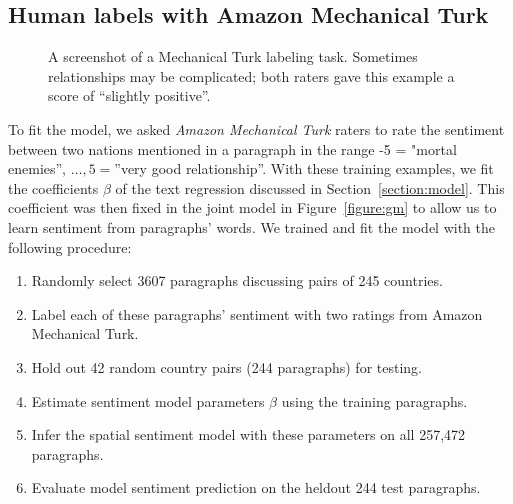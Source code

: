 \subsection{Human labels with Amazon Mechanical Turk}
\label{section:mturk}
\begin{figure}
  \setlength\fboxsep{0pt}
  \setlength\fboxrule{0.5pt}
  \center {}
  \label{figure:mechanical_turk_sample}
  \small\caption{A screenshot of a Mechanical Turk labeling task.
    Sometimes relationships may be complicated; both raters gave this
    example a score of ``slightly positive''.}
  \normalsize
\end{figure}

To fit the model, we asked \emph{Amazon Mechanical Turk} raters to rate the
sentiment between two nations mentioned in a paragraph in the range -5
= "mortal enemies'', $\ldots, 5 = $''very good relationship''.
With these training examples, we fit the coefficients $\beta$ of the
text regression discussed in Section~\ref{section:model}.  This
coefficient was then fixed in the joint model in
Figure~\ref{figure:gm} to allow us to learn sentiment from
paragraphs' words.  We trained and fit the model with the following procedure:

\begin{enumerate}
  \item Randomly select 3607 paragraphs discussing pairs of 245 countries.
  \item Label each of these paragraphs' sentiment with two ratings
    from Amazon Mechanical Turk.
  \item Hold out 42 random country pairs (244 paragraphs) for testing.
  \item Estimate sentiment model parameters $\beta$ using the training
    paragraphs.
  \item Infer the spatial sentiment model with these parameters on
    all 257,472 paragraphs.
  \item Evaluate model sentiment prediction on the heldout 244 test
    paragraphs.
\end{enumerate}
  
